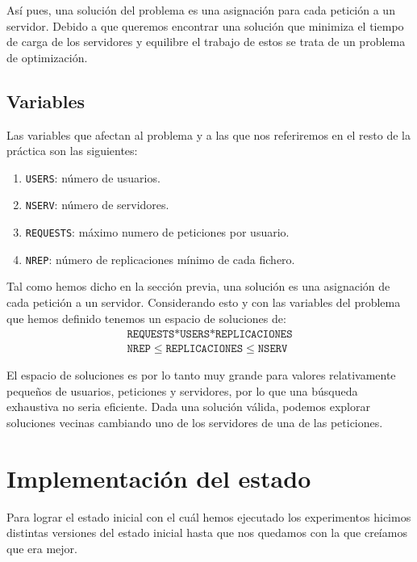 Así pues, una solución del problema es una asignación para cada petición a un servidor. Debido a que queremos encontrar
una solución que minimiza el tiempo de carga de los servidores y equilibre el trabajo de estos se trata de un problema
de optimización.

\subsection{Variables}%
\label{ssec:variables}



Las variables que afectan al problema y a las que nos referiremos en el resto de la práctica son las siguientes:

\begin{enumerate}
    \item \texttt{USERS}: número de usuarios.
    \item \texttt{NSERV}: número de servidores.
    \item \texttt{REQUESTS}: máximo numero de peticiones por usuario.
    \item \texttt{NREP}: número de replicaciones mínimo de cada fichero.
\end{enumerate}

Tal como hemos dicho en la sección previa, una solución es una asignación de cada petición a un servidor. Considerando
esto y con las variables del problema que hemos definido tenemos un espacio de soluciones de:
\begin{align}
\texttt{REQUESTS*USERS*REPLICACIONES} \\
\texttt{NREP} \leq \texttt{REPLICACIONES} \leq \texttt{NSERV}
\end{align}

El espacio de soluciones es por lo tanto muy grande para valores relativamente pequeños de usuarios, peticiones y
servidores, por lo que una búsqueda exhaustiva no seria eficiente. Dada una solución válida,
podemos explorar soluciones vecinas cambiando uno de los servidores de una de las peticiones. 

\section{Implementación del estado}

Para lograr el estado inicial con el cuál hemos ejecutado los experimentos hicimos distintas versiones del estado inicial hasta que nos quedamos con la que creíamos que era mejor.

